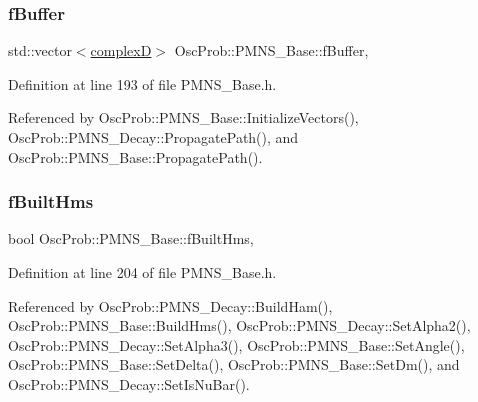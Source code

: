 \subsubsection{\texorpdfstring{f\+Buffer}{fBuffer}}
{\footnotesize\ttfamily std\+::vector$<$\hyperlink{EigenPoint_8h_a67ca8e107e20610c3fff78d5e726ece0}{complexD}$>$ Osc\+Prob\+::\+P\+M\+N\+S\+\_\+\+Base\+::f\+Buffer\hspace{0.3cm}{\ttfamily [protected]}, {\ttfamily [inherited]}}



Definition at line 193 of file P\+M\+N\+S\+\_\+\+Base.\+h.



Referenced by Osc\+Prob\+::\+P\+M\+N\+S\+\_\+\+Base\+::\+Initialize\+Vectors(), Osc\+Prob\+::\+P\+M\+N\+S\+\_\+\+Decay\+::\+Propagate\+Path(), and Osc\+Prob\+::\+P\+M\+N\+S\+\_\+\+Base\+::\+Propagate\+Path().

\mbox{\label{classOscProb_1_1PMNS__Base_a9ac3cadeac8db1b90f3152f476244780}} 
\subsubsection{\texorpdfstring{f\+Built\+Hms}{fBuiltHms}}
{\footnotesize\ttfamily bool Osc\+Prob\+::\+P\+M\+N\+S\+\_\+\+Base\+::f\+Built\+Hms\hspace{0.3cm}{\ttfamily [protected]}, {\ttfamily [inherited]}}



Definition at line 204 of file P\+M\+N\+S\+\_\+\+Base.\+h.



Referenced by Osc\+Prob\+::\+P\+M\+N\+S\+\_\+\+Decay\+::\+Build\+Ham(), Osc\+Prob\+::\+P\+M\+N\+S\+\_\+\+Base\+::\+Build\+Hms(), Osc\+Prob\+::\+P\+M\+N\+S\+\_\+\+Decay\+::\+Set\+Alpha2(), Osc\+Prob\+::\+P\+M\+N\+S\+\_\+\+Decay\+::\+Set\+Alpha3(), Osc\+Prob\+::\+P\+M\+N\+S\+\_\+\+Base\+::\+Set\+Angle(), Osc\+Prob\+::\+P\+M\+N\+S\+\_\+\+Base\+::\+Set\+Delta(), Osc\+Prob\+::\+P\+M\+N\+S\+\_\+\+Base\+::\+Set\+Dm(), and Osc\+Prob\+::\+P\+M\+N\+S\+\_\+\+Decay\+::\+Set\+Is\+Nu\+Bar().

\mbox{\label{classOscProb_1_1PMNS__Base_a0b4c41a27de281472453a1912cbc1e64}} 

